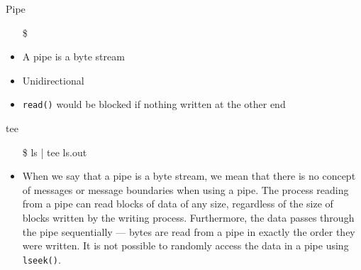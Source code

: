 \begin{frame}{Pipe}
  \begin{itemize}
  \item[\$] 
  \end{itemize}
  \begin{center}
  \end{center}
  \begin{itemize}
  \item A pipe is a byte stream
  \item Unidirectional
  \item \texttt{read()} would be blocked if nothing written at the other end
  \end{itemize}
  \ttfamily
  \begin{block}{tee}
    \begin{center}
      \begin{minipage}{.3\linewidth}
        \begin{itemize}
        \item[\$] ls | tee ls.out
        \end{itemize}
      \end{minipage}\quad
      \begin{minipage}{.4\linewidth}
      \end{minipage}
    \end{center}
  \end{block}
\end{frame}

\begin{itemize}
\item When we say that a pipe is a byte stream, we mean that there is no concept of
  messages or message boundaries when using a pipe. The process reading from a pipe can
  read blocks of data of any size, regardless of the size of blocks written by the writing
  process. Furthermore, the data passes through the pipe sequentially --- bytes are read from
  a pipe in exactly the order they were written. It is not possible to randomly access the
  data in a pipe using \texttt{lseek()}. 
\end{itemize}


